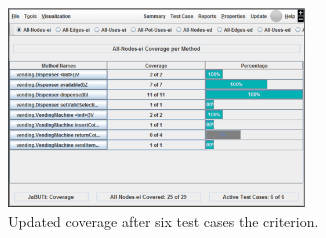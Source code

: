 
\begin{figure}[!ht]
\begin{center}
\includegraphics[width=0.70\textwidth]{fig/report-by-method-pri-nodes-tc6.eps}
\caption{\label{fig:summary-method-tc6} Updated coverage after six
test cases \wrt the  criterion.}
\end{center}
\end{figure}
